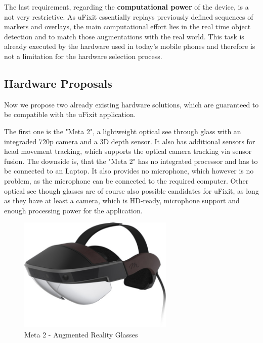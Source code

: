 The last requirement, regarding the \textbf{computational power} of the device, is a not very restrictive. As uFixit essentially replays previously defined sequences of markers and overlays, the main computational effort lies in the real time object detection and to match those augmentations with the real world. This task is already executed by the hardware used in today’s mobile phones and therefore is not a limitation for the hardware selection process.

\subsection{Hardware Proposals}
Now we propose two already existing hardware solutions, which are guaranteed to be compatible with the uFixit application. 

The first one is the "Meta 2", a lightweight optical see through glass with an integraded 720p camera and a 3D depth sensor. It also has additional sensors for head movement tracking, which supports the optical camera tracking via sensor fusion. The downside is, that the "Meta 2" has no integrated processor and has to be connected to an Laptop. It also provides no microphone, which however is no problem, as the microphone can be connected to the required computer.
Other optical see though glasses are of course also possible candidates for uFixit, as long as they have at least a camera, which is HD-ready, microphone support and enough processing power for the application.
\begin{figure}[H]
		\includegraphics[width=0.66\textwidth]{../images/meta2.jpg}
		\centering
		\caption{Meta 2 - Augmented Reality Glasses}
		\label{fig:SWOT}
\end{figure}

